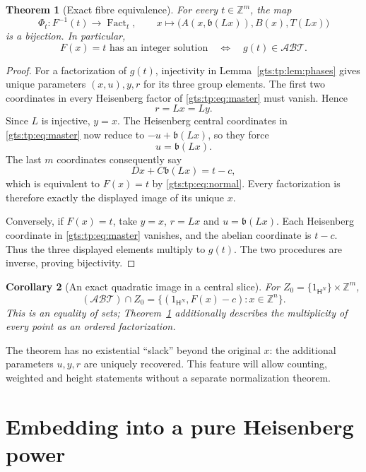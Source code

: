 \documentclass[11pt,letterpaper]{article}
\newtheorem{theorem}{Theorem}[section]
\newtheorem{corollary}[theorem]{Corollary}
\theoremstyle{definition}
\theoremstyle{remark}
\newcommand{\ZZ}{\mathbb Z}
\newcommand{\HH}{\mathsf H}
\newcommand{\calA}{\mathcal A}
\newcommand{\calB}{\mathcal B}
\newcommand{\calT}{\mathcal T}
\newcommand{\bn}{\mathfrak b}
\DeclareMathOperator{\Fact}{Fact}
\begin{document}
\begin{theorem}[Exact fibre equivalence]\label{gts:tp:thm:fibres}
For every $t\in\ZZ^m$, the map
\begin{equation}\label{gts:tp:eq:fibermap}
 \Phi_t:F^{-1}(t)\longrightarrow\Fact_t,\qquad
 x\longmapsto\big(A(x,\bn(Lx)),B(x),T(Lx)\big)
\end{equation}
is a bijection. In particular,
\[
                 F(x)=t\text{ has an integer solution}
                 \quad\Longleftrightarrow\quad
                 g(t)\in\calA\calB\calT.
\]
\end{theorem}
\begin{proof}
For a factorization of $g(t)$, injectivity in Lemma~\ref{gts:tp:lem:phases} gives
unique parameters $(x,u),y,r$ for its three group elements. The first two
coordinates in every Heisenberg factor of \eqref{gts:tp:eq:master} must vanish.
Hence
\[
                     r=Lx=Ly.
\]
Since $L$ is injective, $y=x$. The Heisenberg central coordinates in
\eqref{gts:tp:eq:master} now reduce to $-u+\bn(Lx)$, so they force
\[
                     u=\bn(Lx).
\]
The last $m$ coordinates consequently say
\[
                   Dx+C\bn(Lx)=t-c,
\]
which is equivalent to $F(x)=t$ by \eqref{gts:tp:eq:normal}. Every factorization is
therefore exactly the displayed image of its unique $x$.

Conversely, if $F(x)=t$, take $y=x$, $r=Lx$ and $u=\bn(Lx)$. Each
Heisenberg coordinate in \eqref{gts:tp:eq:master} vanishes, and the abelian
coordinate is $t-c$. Thus the three displayed elements multiply to $g(t)$.
The two procedures are inverse, proving bijectivity.
\end{proof}

\begin{corollary}[An exact quadratic image in a central slice]\label{gts:tp:cor:slice}
For $Z_0=\{1_{\HH^N}\}\times\ZZ^m$,
\[
 (\calA\calB\calT)\cap Z_0
    =\{(1_{\HH^N},F(x)-c):x\in\ZZ^n\}.
\]
This is an equality of sets; Theorem~\ref{gts:tp:thm:fibres} additionally describes
the multiplicity of every point as an ordered factorization.
\end{corollary}

The theorem has no existential ``slack'' beyond the original $x$: the
additional parameters $u,y,r$ are uniquely recovered. This feature will
allow counting, weighted and height statements without a separate
normalization theorem.

\section{Embedding into a pure Heisenberg power}
\label{gts:tp:sec:embedding}
\end{document}
